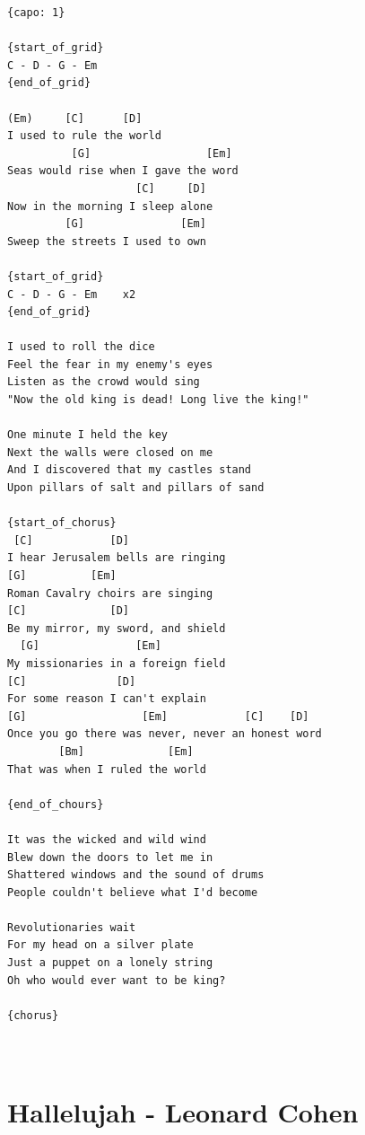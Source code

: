 \documentclass[]{book}
\let\stdsection\section
\renewcommand\section{\clearpage\stdsection}
\begin{document}
\begin{verbatim}
{capo: 1}

{start_of_grid}
C - D - G - Em 
{end_of_grid}

(Em)     [C]      [D]
I used to rule the world
          [G]                  [Em]
Seas would rise when I gave the word
                    [C]     [D]
Now in the morning I sleep alone    
         [G]               [Em]
Sweep the streets I used to own

{start_of_grid}
C - D - G - Em    x2
{end_of_grid}

I used to roll the dice 
Feel the fear in my enemy's eyes 
Listen as the crowd would sing 
"Now the old king is dead! Long live the king!" 

One minute I held the key 
Next the walls were closed on me 
And I discovered that my castles stand 
Upon pillars of salt and pillars of sand 

{start_of_chorus}
 [C]            [D]
I hear Jerusalem bells are ringing
[G]          [Em]
Roman Cavalry choirs are singing
[C]             [D]
Be my mirror, my sword, and shield
  [G]               [Em]
My missionaries in a foreign field
[C]              [D]
For some reason I can't explain
[G]                  [Em]            [C]    [D]
Once you go there was never, never an honest word
        [Bm]             [Em]
That was when I ruled the world

{end_of_chours}

It was the wicked and wild wind 
Blew down the doors to let me in 
Shattered windows and the sound of drums 
People couldn't believe what I'd become 

Revolutionaries wait 
For my head on a silver plate 
Just a puppet on a lonely string 
Oh who would ever want to be king? 

{chorus}



\end{verbatim}

\hypertarget{hallelujah---leonard-cohen}{%
\section{Hallelujah - Leonard Cohen}\label{hallelujah---leonard-cohen}}
\end{document}
